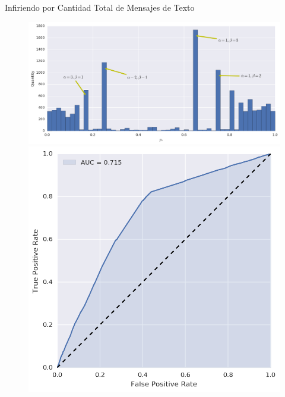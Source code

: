 \documentclass{beamer}
\begin{document}
\begin{frame}{Infiriendo por Cantidad Total de Mensajes de Texto}

	\begin{figure}
		\includegraphics[width=\framewidth, height=.37\textheight, keepaspectratio]{figures/bayes/hist_sms.png} \\
		\includegraphics[width=.49\framewidth, height=.37\textheight, keepaspectratio]{figures/bayes/roc_sms.png}

\end{figure}
\end{frame}
\end{document}
